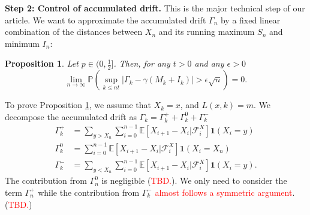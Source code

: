 \documentclass[twoside,12pt,a4paper]{article}
\newtheorem{proposition}{Proposition}[section]
\numberwithin{equation}{section}
\newcommand{\abs}[1]{\left\vert #1 \right\vert}
\newcommand\TBD{\textcolor{red}{TBD.}}
\begin{document}
	\textbf{Step 2: Control of accumulated drift.} This is the major technical step of our article. We want to approximate the accumulated drift $\Gamma_n$ by a fixed linear combination of the distances between $X_n$ and its running maximum $S_n$ and minimum $I_n$:
	\begin{proposition}\label{lm: control of acc drift}
		Let $p\in (0,\frac{1}{2}]$. Then, for any $t>0$ and any $\epsilon >0$
		\begin{equation}\label{eq: control of acc drift}
			\lim_{n \to \infty }\mathbb{P}\left(\sup_{k\leq nt} \abs{\Gamma_k - \gamma \left(M_k + I_k \right)   } > \epsilon \sqrt{n}  \right) =0. 
		\end{equation}
	\end{proposition}
	To prove Proposition \ref{lm: control of acc drift}, we assume that $X_k=x $, and $L(x,k)=m$. We decompose the accumulated drift as $\Gamma_k = 	\Gamma_k^+ +	\Gamma_k^0 + \Gamma_k^-$ 
	\begin{align}
		\Gamma_k^+ &= \sum_{y > X_n} \sum_{i = 0}^{n-1} \mathbb{E}\left[ X_{i + 1} - X_i | \mathcal{F}_i^X \right] \mathbf{1}(X_i = y)\\
		\Gamma_k^0 &= \sum_{i = 0}^{n-1} \mathbb{E}\left[ X_{i + 1} - X_i | \mathcal{F}_i^X \right] \mathbf{1}(X_i = X_n) \\
		\Gamma_k^- &= \sum_{y < X_n} \sum_{i = 0}^{n-1} \mathbb{E}\left[ X_{i + 1} - X_i | \mathcal{F}_i^X \right] \mathbf{1}(X_i = y)
		.\end{align} 
	The contribution from $\Gamma_n^0$ is negligible (\TBD). We only need to consider the term $\Gamma_n^+$ while the contribution from $\Gamma_k^-$ \textcolor{red}{almost follows a symmetric argument}. (\TBD) 
	
\end{document}
